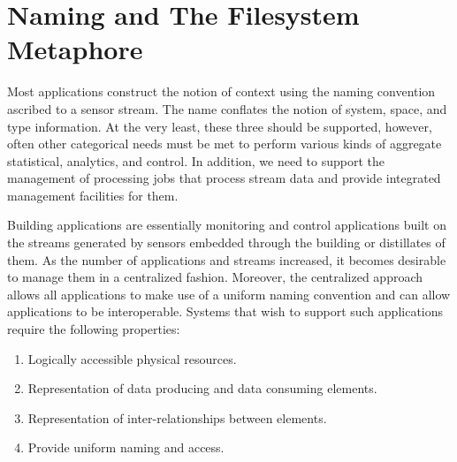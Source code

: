 

\section{Naming and The Filesystem Metaphore}
\label{chap:naming}

Most applications
construct the notion of context using the naming convention ascribed to a sensor stream.  The name conflates the notion of system,
space, and type information.  At the very least, these three should be supported, however, often other categorical needs must be
met to perform various kinds of aggregate statistical, analytics, and control.  In addition, we need to support the management of
processing jobs that process stream data and provide integrated management facilities for them.

Building applications are essentially monitoring and control applications built on the streams generated by sensors embedded through
the building or distillates of them.  As the number of applications and streams increased, it becomes desirable to manage them 
in a centralized fashion.  Moreover, the centralized approach allows all applications to make use of a uniform naming convention and
can allow applications to be interoperable.  Systems that wish to support such applications require the following properties:

\begin{enumerate}
\item Logically accessible physical resources.
\item Representation of data producing and data consuming elements.
\item Representation of inter-relationships between elements.
\item Provide uniform naming and access.
\end{enumerate}

 



% 
% 
% 



